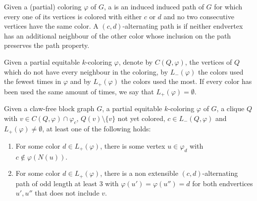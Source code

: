 \begin{definition}
    Given a (partial) coloring $\varphi$ of $G$, a  is an induced induced path of $G$ for which every one of its vertices is colored with either $c$ or $d$ and no two consecutive vertices have the same color.
    A $(c,d)$-alternating path is  if neither endvertex has an additional neighbour of the other color whose inclusion on the path preserves the path property.
\end{definition}


Given a partial equitable $k$-coloring $\varphi$, denote by $C(Q, \varphi)$, the vertices of $Q$ which do not have every neighbour in the coloring, by $L_-(\varphi)$ the colors used the fewest times in $\varphi$ and by $L_+(\varphi)$ the colors used the most.
If every color has been used the same amount of times, we say that $L_+(\varphi) = \emptyset$.

\begin{lemma}
    \label{lem:always_color_claw_free}
    Given a claw-free block graph $G$, a partial equitable $k$-coloring $\varphi$ of $G$, a clique $Q$ with $v \in C(Q, \varphi) \cap \varphi_c$, $Q(v) \setminus \{v\}$ not yet colored, $c \in L_-(Q,\varphi)$ and $L_+(\varphi) \neq \emptyset$, at least one of the following holds:
    \begin{enumerate}
        \item For some color $d \in L_+(\varphi)$, there is some vertex $u \in \varphi_d$ with $c \notin \varphi(N(u))$.
        \item For some color $d \in L_+(\varphi)$, there is a non extensible $(c, d)$-alternating path of odd length at least 3 with $\varphi(u') = \varphi(u'') = d$ for both endvertices $u',u''$ that does not include $v$.
    \end{enumerate}
\end{lemma}

